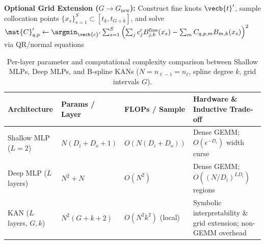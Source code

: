 \documentclass[../../../../master.tex]{subfiles}
\begin{document}
\begin{algorithm}[htbp]
\caption{KAN Layer Forward Pass (Cox--de Boor) \& Grid Extension}
\label{alg:mlpkan:kan_forward}
\BlankLine
{}
\BlankLine
\textbf{Optional Grid Extension ($G \to G_{\text{new}}$):} Construct fine knots $\vecb{t}'$, sample collocation points $\{x_s\}_{s=1}^S \subset [t_k, t_{G+k}]$, and solve $\mat{C}'_{q,p} \leftarrow \argmin_{\vecb{c}'} \sum_{s=1}^S \left(\sum_j c'_j B^{\text{fine}}_{j,k}(x_s) - \sum_m C_{q,p,m} B_{m,k}(x_s)\right)^2$ via QR/normal equations\;
\end{algorithm}

\begin{table}[htbp]
\centering
\caption{Per-layer parameter and computational complexity comparison between Shallow MLPs, Deep MLPs, and B-spline KANs ($N = n_{\ell-1} = n_\ell$, spline degree $k$, grid intervals $G$).}
\label{tab:mlpkan:complexity}
\small
\begin{tabularx}{\textwidth}{@{}l l l >{\raggedright\arraybackslash}X@{}}
\toprule
\textbf{Architecture} & \textbf{Params / Layer} & \textbf{FLOPs / Sample} & \textbf{Hardware \& Inductive Trade-off} \\
\midrule
Shallow MLP ($L=2$) & $N(D_i + D_o + 1)$ & $O(N(D_i + D_o))$ & Dense GEMM; $O(\epsilon^{-D_i})$ width curse \\
Deep MLP ($L$ layers) & $N^2 + N$ & $O(N^2)$ & Dense GEMM; $O((N/D_i)^{L D_i})$ regions \\
KAN ($L$ layers, $G, k$) & $N^2(G + k + 2)$ & $O(N^2 k^2)$ (local) & Symbolic interpretability \& grid extension; non-GEMM overhead \\
\bottomrule
\end{tabularx}
\end{table}
\end{document}
